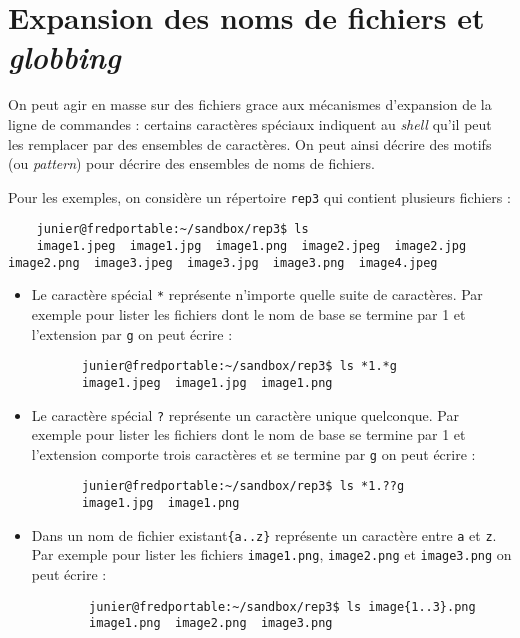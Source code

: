 \documentclass[
  11pt,
]{article}
\newcounter{exo}
\begin{document}
\hypertarget{expansion-des-noms-de-fichiers-et-globbing}{%
\section{\texorpdfstring{Expansion des noms de fichiers et
\emph{globbing}}{Expansion des noms de fichiers et globbing}}\label{expansion-des-noms-de-fichiers-et-globbing}}

On peut agir en masse sur des fichiers grace aux mécanismes d'expansion
de la ligne de commandes : certains caractères spéciaux indiquent au
\emph{shell} qu'il peut les remplacer par des ensembles de caractères.
On peut ainsi décrire des motifs (ou \emph{pattern}) pour décrire des
ensembles de noms de fichiers.

Pour les exemples, on considère un répertoire \texttt{rep3} qui contient
plusieurs fichiers :

\begin{verbatim}
    junier@fredportable:~/sandbox/rep3$ ls
    image1.jpeg  image1.jpg  image1.png  image2.jpeg  image2.jpg  image2.png  image3.jpeg  image3.jpg  image3.png  image4.jpeg
\end{verbatim}

\begin{itemize}
\item
  Le caractère spécial \texttt{*} représente n'importe quelle suite de
  caractères. Par exemple pour lister les fichiers dont le nom de base
  se termine par 1 et l'extension par \texttt{g} on peut écrire :

\begin{verbatim}
       junier@fredportable:~/sandbox/rep3$ ls *1.*g
       image1.jpeg  image1.jpg  image1.png
\end{verbatim}
\item
  Le caractère spécial \texttt{?} représente un caractère unique
  quelconque. Par exemple pour lister les fichiers dont le nom de base
  se termine par 1 et l'extension comporte trois caractères et se
  termine par \texttt{g} on peut écrire :

\begin{verbatim}
       junier@fredportable:~/sandbox/rep3$ ls *1.??g
       image1.jpg  image1.png
\end{verbatim}
\item
  Dans un nom de fichier existant\texttt{\{a..z\}} représente un
  caractère entre \texttt{a} et \texttt{z}. Par exemple pour lister les
  fichiers \texttt{image1.png}, \texttt{image2.png} et
  \texttt{image3.png} on peut écrire :

\begin{verbatim}
        junier@fredportable:~/sandbox/rep3$ ls image{1..3}.png
        image1.png  image2.png  image3.png
\end{verbatim}
\end{itemize}
\end{document}

